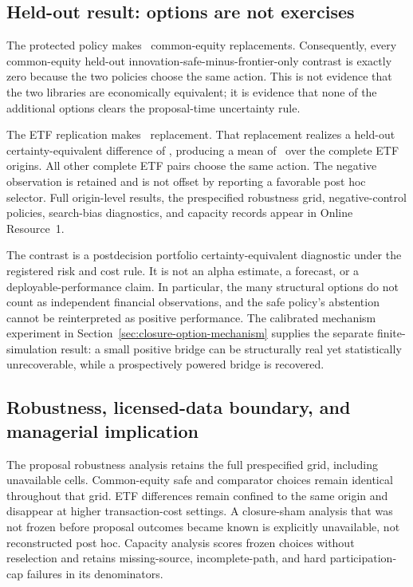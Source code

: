 \AORPointInTimeFinancialTable

\subsection{Held-out result: options are not exercises}

The protected policy makes \AORPointInTimeEquityPolicyReplacements\
common-equity replacements. Consequently, every common-equity held-out
innovation-safe-minus-frontier-only contrast is exactly zero because the two
policies choose the same action. This is not evidence that the two libraries
are economically equivalent; it is evidence that none of the additional
options clears the proposal-time uncertainty rule.

The ETF replication makes \AORPointInTimeETFPolicyReplacements\ replacement.
That replacement realizes a held-out certainty-equivalent difference of
\AORPointInTimeETFMinimumCE, producing a mean of
\AORPointInTimeETFMeanCE\ over the complete ETF origins. All other complete ETF
pairs choose the same action. The negative observation is retained and is not
offset by reporting a favorable post hoc selector. Full origin-level results,
the prespecified robustness grid, negative-control policies, search-bias
diagnostics, and capacity records appear in Online Resource~1.

The contrast is a postdecision portfolio certainty-equivalent diagnostic under
the registered risk and cost rule. It is not an alpha estimate, a forecast, or
a deployable-performance claim. In particular, the many structural options do
not count as independent financial observations, and the safe policy's
abstention cannot be reinterpreted as positive performance. The calibrated
mechanism experiment in Section~\ref{sec:closure-option-mechanism} supplies the
separate finite-simulation result: a small positive bridge can be structurally
real yet statistically unrecoverable, while a prospectively powered bridge is
recovered.

\subsection{Robustness, licensed-data boundary, and managerial implication}

The proposal robustness analysis retains the full prespecified grid, including
unavailable cells. Common-equity safe and comparator choices remain identical
throughout that grid. ETF differences remain confined to the same origin and
disappear at higher transaction-cost settings. A closure-sham analysis that
was not frozen before proposal outcomes became known is explicitly unavailable,
not reconstructed post hoc. Capacity analysis scores frozen choices without
reselection and retains missing-source, incomplete-path, and hard participation-
cap failures in its denominators.

